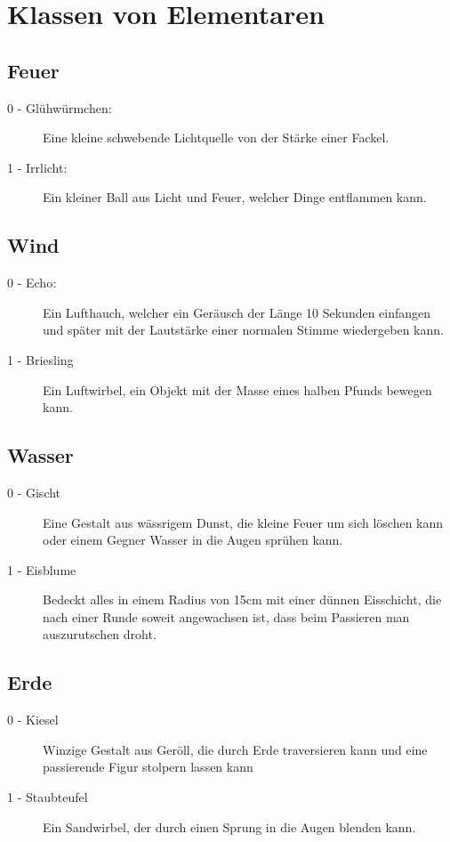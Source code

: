 \documentclass[a4paper,12pt,oneside]{book}
\begin{document}
\section{Klassen von Elementaren}
\subsection{Feuer}
\begin{description}
\item[0 - Glühwürmchen:]Eine kleine schwebende Lichtquelle von der Stärke einer Fackel.
\item[1 - Irrlicht:]Ein kleiner Ball aus Licht und Feuer, welcher Dinge entflammen kann.
\end{description}
\subsection{Wind}
\begin{description}
\item[0 - Echo:]Ein Lufthauch, welcher ein Geräusch der Länge 10 Sekunden einfangen und später mit der Lautstärke einer normalen Stimme wiedergeben kann.
\item[1 - Briesling]Ein Luftwirbel, ein Objekt mit der Masse eines halben Pfunds bewegen kann.
\end{description}
\subsection{Wasser}
\begin{description} 
\item[0 - Gischt]Eine Gestalt aus wässrigem Dunst, die kleine Feuer um sich löschen kann oder einem Gegner Wasser in die Augen sprühen kann.
\item[1 - Eisblume]Bedeckt alles in einem Radius von 15cm mit einer dünnen Eisschicht, die nach einer Runde soweit angewachsen ist, dass beim Passieren man auszurutschen droht.
\end{description}
\subsection{Erde}
\begin{description} 
\item[0 - Kiesel]Winzige Gestalt aus Geröll, die durch Erde traversieren kann und eine passierende Figur stolpern lassen kann 
\item[1 - Staubteufel]Ein Sandwirbel, der durch einen Sprung in die Augen blenden kann.
\end{description}
\end{document}
